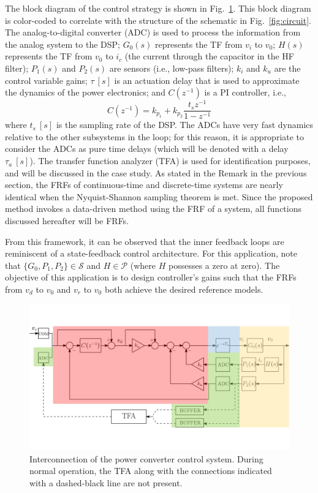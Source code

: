 \documentclass[a4paper, 10pt, conference]{ieeeconf}
\begin{document}
The block diagram of the control strategy is shown in Fig.~\ref{fig:damping_loop}. This block diagram is color-coded to correlate with the structure of the schematic in Fig.~\ref{fig:circuit}. The analog-to-digital converter (ADC) is used to process the information from the analog system to the DSP; $G_0(s)$ represents the TF from $v_i$ to $v_0$; $H(s)$ represents the TF from $v_0$ to $i_c$ (the current through the capacitor in the HF filter); $P_1(s)$ and $P_2(s)$ are sensors (i.e., low-pass filters); $k_i$ and $k_u$ are the control variable gains; $\tau \: [s]$ is an actuation delay that is used to approximate the dynamics of the power electronics; and $C(z^{-1})$ is a PI controller, i.e., $$C(z^{-1}) = k_{p_1} + k_{p_2}\frac{t_s z^{-1}}{1-z^{-1}}$$ where $t_s \: [s]$ is the sampling rate of the DSP. The ADCs have very fast dynamics relative to the other subsystems in the loop; for this reason, it is appropriate to consider the ADCs as pure time delays (which will be denoted with a delay $\tau_{a} \: [s]$). The transfer function analyzer (TFA) is used for identification purposes, and will be discussed in the case study. As stated in the Remark in the previous section, the FRFs of continuous-time and discrete-time systems are nearly identical when the Nyquist-Shannon sampling theorem is met. Since the proposed method invokes a data-driven method using the FRF of a system, all functions discussed hereafter will be FRFs.

From this framework, it can be observed that the inner feedback loops are reminiscent of a state-feedback control architecture. For this application, note that $\{G_0,P_1,P_2 \} \in \mathscr{S}$ and $H \in \mathscr{P}$ (where $H$ possesses a zero at zero). The objective of this application is to design controller's gains such that the FRFs from $v_d$ to $v_0$ and $v_r$ to $v_0$ both achieve the desired reference models.
\begin{figure}
\centering
\includegraphics[width=1.6\columnwidth]{../pics/voltage_loop_color_coded}
\caption{Interconnection of the power converter control system. During normal operation, the TFA along with the connections indicated with a dashed-black line are not present.}
\label{fig:damping_loop}
\end{figure}
\end{document}
